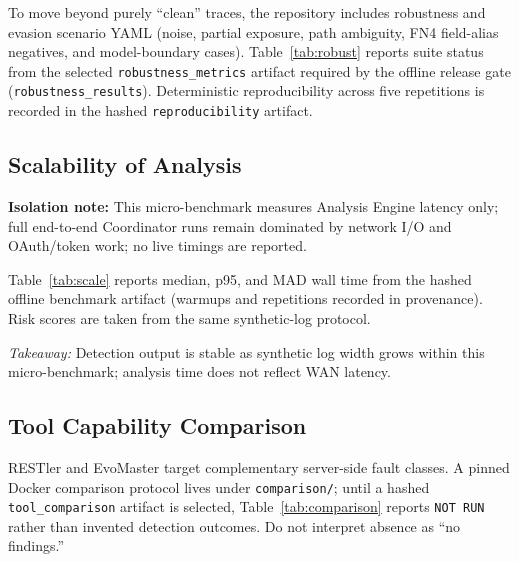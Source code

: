 \documentclass[conference]{IEEEtran}
\begin{document}
To move beyond purely ``clean'' traces, the repository includes
robustness and evasion scenario YAML (noise, partial exposure, path
ambiguity, FN4 field-alias negatives, and model-boundary cases).
Table~\ref{tab:robust} reports suite status from the selected
\texttt{robustness\_metrics} artifact required by the offline release gate
(\texttt{robustness\_results}). Deterministic reproducibility across five
repetitions is recorded in the hashed \texttt{reproducibility} artifact.

\begin{table}[htbp]
  \caption{Robustness / Evasion Suite Status}
  \label{tab:robust}
  \centering
  \renewcommand{\arraystretch}{1.2}
  
\end{table}

\subsection{Scalability of Analysis}
\label{sec:scale}

\noindent\textbf{Isolation note:} This micro-benchmark measures Analysis
Engine latency only; full end-to-end Coordinator runs remain dominated
by network I/O and OAuth/token work; no live timings are reported.

Table~\ref{tab:scale} reports median, p95, and MAD wall time from the
hashed offline benchmark artifact (warmups and repetitions recorded in
provenance). Risk scores are taken from the same synthetic-log
protocol.

\begin{table}[htbp]
  \caption{Analysis Engine Micro-Benchmark (Synthetic Log Width;
  median/p95/MAD from offline \texttt{benchmark\_summary} artifact)}
  \label{tab:scale}
  \centering
  \renewcommand{\arraystretch}{1.2}
  \footnotesize
  
\end{table}

\noindent\textit{Takeaway:} Detection output is stable as synthetic log
width grows within this micro-benchmark; analysis time does not reflect
WAN latency.

\subsection{Tool Capability Comparison}
\label{sec:toolcompeval}

RESTler and EvoMaster target complementary server-side fault classes.
A pinned Docker comparison protocol lives under \texttt{comparison/};
until a hashed \texttt{tool\_comparison} artifact is selected,
Table~\ref{tab:comparison} reports \texttt{NOT RUN} rather than
invented detection outcomes. Do not interpret absence as ``no findings.''
\end{document}
